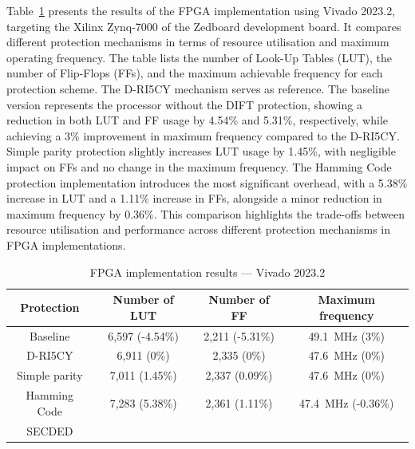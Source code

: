 Table~\ref{tab:chap5_implementation} presents the results of the FPGA implementation using Vivado 2023.2, targeting the Xilinx Zynq-7000 of the Zedboard development board. It compares different protection mechanisms in terms of resource utilisation and maximum operating frequency. The table lists the number of Look-Up Tables (LUT), the number of Flip-Flops (FFs), and the maximum achievable frequency for each protection scheme. The D-RI5CY mechanism serves as reference. The baseline version represents the processor without the DIFT protection, showing a reduction in both LUT and FF usage by 4.54\% and 5.31\%, respectively, while achieving a 3\% improvement in maximum frequency compared to the D-RI5CY.
Simple parity protection slightly increases LUT usage by 1.45\%, with negligible impact on FFs and no change in the maximum frequency. The Hamming Code protection implementation introduces the most significant overhead, with a 5.38\% increase in LUT and a 1.11\% increase in FFs, alongside a minor reduction in maximum frequency by 0.36\%.
This comparison highlights the trade-offs between resource utilisation and performance across different protection mechanisms in FPGA implementations.

\begin{table}[t]
    \footnotesize
    \centering
    \caption{FPGA implementation results — Vivado 2023.2}
    \label{tab:chap5_implementation}
    \setlength{\tabcolsep}{3pt}
    \begin{tabular}{@{}c|ccc@{}}
        \toprule
        Protection    & Number of LUT   & Number of FF    & Maximum frequency                \\ \midrule
        Baseline      & 6,597 (-4.54\%) & 2,211 (-5.31\%) & \SI{49.1}{\mega\hertz} (3\%)     \\
        D-RI5CY       & 6,911 (0\%)     & 2,335 (0\%)     & \SI{47.6}{\mega\hertz} (0\%)     \\
        Simple parity & 7,011 (1.45\%)  & 2,337 (0.09\%)  & \SI{47.6}{\mega\hertz} (0\%)     \\
        Hamming Code  & 7,283 (5.38\%)  & 2,361 (1.11\%)  & \SI{47.4}{\mega\hertz} (-0.36\%) \\
        SECDED        &                 &                 &                                  \\
        \bottomrule
    \end{tabular}
\end{table}

